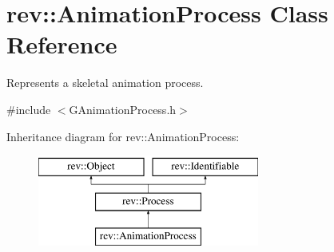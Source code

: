\hypertarget{classrev_1_1_animation_process}{}\section{rev\+::Animation\+Process Class Reference}
\label{classrev_1_1_animation_process}


Represents a skeletal animation process.  




{\ttfamily \#include $<$G\+Animation\+Process.\+h$>$}

Inheritance diagram for rev\+::Animation\+Process\+:\begin{figure}[H]
\begin{center}
\leavevmode
\includegraphics[height=3.000000cm]{classrev_1_1_animation_process}
\end{center}
\end{figure}

